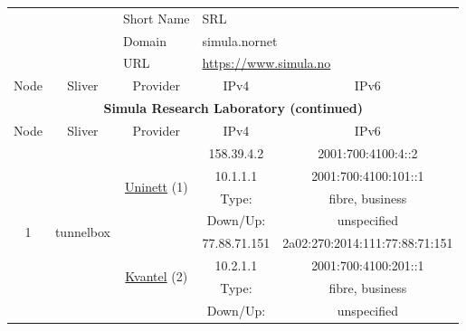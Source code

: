 \begin{small}
\begin{center}
\begin{longtable}{|c|c|c|c|c|c|c|c|}
 \multicolumn{4}{|c|}{} & \multicolumn{1}{|l|}{Short Name} & \multicolumn{3}{|l|}{\nomenclature{SRL}{Simula Research Laboratory}\index{SRL|see{Simula Research Laboratory}}SRL} \\* \cline{5-5}\cline{6-6}\cline{7-7}\cline{8-8}
 \multicolumn{4}{|c|}{} & \multicolumn{1}{|l|}{Domain} & \multicolumn{3}{|l|}{\index{simula.nornet}simula.nornet} \\* \cline{5-5}\cline{6-6}\cline{7-7}\cline{8-8}
 \multicolumn{4}{|c|}{} & \multicolumn{1}{|l|}{URL} & \multicolumn{3}{|l|}{\url{https://www.simula.no}} \\ \hline
 \multicolumn{2}{|p{8em}|}{Node} & \multicolumn{2}{|p{8em}|}{Sliver} & \multicolumn{2}{|p{8em}|}{Provider} & IPv4 & IPv6 \\ \hline
\endfirsthead
\hline
 \multicolumn{8}{|c|}{\textbf{Simula Research Laboratory (continued)}} \\ \hline
 \multicolumn{2}{|p{8em}|}{Node} & \multicolumn{2}{|p{8em}|}{Sliver} & \multicolumn{2}{|p{8em}|}{Provider} & IPv4 & IPv6 \\ \hline
\endhead
 \multirow{16}{*}{\tiny{1}} & \multicolumn{3}{|c|}{\multirow{16}{*}{\tiny{tunnelbox}}} & \multicolumn{2}{|c|}{\multirow{4}{*}{\tiny{\href{https://www.uninett.no}{Uninett} (1)}}} & \tiny{158.39.4.2} & \tiny{2001:700:4100:4::2} \\* \cline{7-7}\cline{8-8}
  & \multicolumn{3}{|c|}{} & \multicolumn{2}{|c|}{} & \tiny{10.1.1.1} & \tiny{2001:700:4100:101::1} \\* \cline{7-7}\cline{8-8}
  & \multicolumn{3}{|c|}{} & \multicolumn{2}{|c|}{} & Type: & fibre, business \\* \cline{7-7}\cline{8-8}
  & \multicolumn{3}{|c|}{} & \multicolumn{2}{|c|}{} & Down/Up:  & unspecified \\* \cline{5-5}\cline{6-6}\cline{7-7}\cline{8-8}
  & \multicolumn{3}{|c|}{} & \multicolumn{2}{|c|}{\multirow{4}{*}{\tiny{\href{http://kvantel.no}{Kvantel} (2)}}} & \tiny{77.88.71.151} & \tiny{2a02:270:2014:111:77:88:71:151} \\* \cline{7-7}\cline{8-8}
  & \multicolumn{3}{|c|}{} & \multicolumn{2}{|c|}{} & \tiny{10.2.1.1} & \tiny{2001:700:4100:201::1} \\* \cline{7-7}\cline{8-8}
  & \multicolumn{3}{|c|}{} & \multicolumn{2}{|c|}{} & Type: & fibre, business \\* \cline{7-7}\cline{8-8}
  & \multicolumn{3}{|c|}{} & \multicolumn{2}{|c|}{} & Down/Up:  & unspecified \\* \cline{5-5}\cline{6-6}\cline{7-7}\cline{8-8}

\end{longtable}
\end{center}
\end{small}
